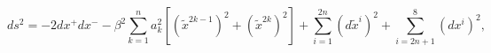 \begin{equation}
\label{genppII}
ds^2 = -2 dx^+ dx^-
- \beta^2 \sum_{k=1}^n a_k^2 \left[ (\tilde{x}^{2k-1})^2 +
(\tilde{x}^{2k})^2 \right]
+ \sum_{i=1}^{2n} (d\tilde{x}^i)^2 
+ \sum_{i=2n+1}^8 (dx^i)^2, 
\end{equation}

